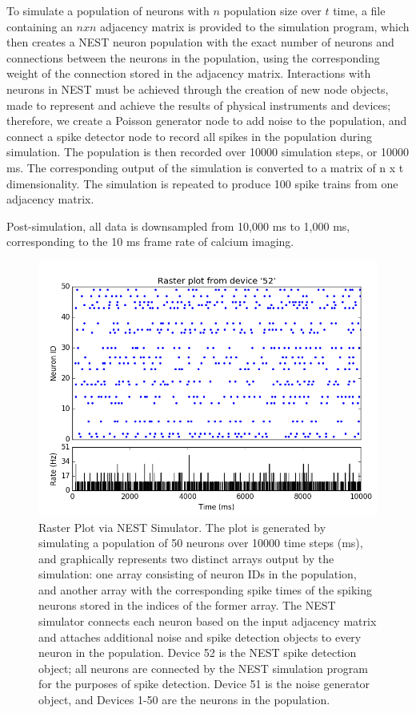 \documentclass[11pt]{article}
\begin{document}
To simulate a population of neurons with $n$ population size over $t$ time, a file containing an $n x n$ adjacency matrix is provided to the simulation program, which then creates a NEST neuron population with the exact number of neurons and connections between the neurons in the population, using the corresponding weight of the connection stored in the adjacency matrix. Interactions with neurons in NEST must be achieved through the creation of new node objects, made to represent and achieve the results of physical instruments and devices; therefore, we create a Poisson generator node to add noise to the population, and connect a spike detector node to record all spikes in the population during simulation. The population is then recorded over 10000 simulation steps, or 10000 ms. The corresponding output of the simulation is converted to a matrix of n x t dimensionality. The simulation is repeated to produce 100 spike trains from one adjacency matrix.\par
Post-simulation, all data is downsampled from 10,000 ms to 1,000 ms, corresponding to the 10 ms frame rate of calcium imaging.

\begin{figure}[H]
\centering
	\includegraphics[scale=0.5]{./Figures/figure_1.png} 
	\caption{Raster Plot via NEST Simulator. The plot is generated by simulating a population of 50 neurons over 10000 time steps (ms), and graphically represents two distinct arrays output by the simulation: one array consisting of neuron IDs in the population, and another array with the corresponding spike times of the spiking neurons stored in the indices of the former array. The NEST simulator connects each neuron based on the input adjacency matrix and attaches additional noise and spike detection objects to every neuron in the population. Device 52 is the NEST spike detection object; all neurons are connected by the NEST simulation program for the purposes of spike detection. Device 51 is the noise generator object, and Devices 1-50 are the neurons in the population. }
\end{figure}
\end{document}
